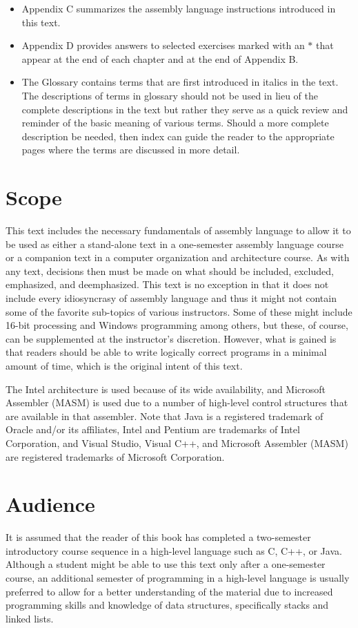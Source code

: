 \documentclass[10pt]{article}
\begin{document}
\begin{itemize}
  \item Appendix C summarizes the assembly language instructions introduced in this text.
  \item Appendix D provides answers to selected exercises marked with an $*$ that appear at the end of each chapter and at the end of Appendix B.
  \item The Glossary contains terms that are first introduced in italics in the text. The descriptions of terms in glossary should not be used in lieu of the complete descriptions in the text but rather they serve as a quick review and reminder of the basic meaning of various terms. Should a more complete description be needed, then index can guide the reader to the appropriate pages where the terms are discussed in more detail.
\end{itemize}

\section*{Scope}
This text includes the necessary fundamentals of assembly language to allow it to be used as either a stand-alone text in a one-semester assembly language course or a companion text in a computer organization and architecture course. As with any text, decisions then must be made on what should be included, excluded, emphasized, and deemphasized. This text is no exception in that it does not include every idiosyncrasy of assembly language and thus it might not contain some of the favorite sub-topics of various instructors. Some of these might include 16-bit processing and Windows programming among others, but these, of course, can be supplemented at the instructor's discretion. However, what is gained is that readers should be able to write logically correct programs in a minimal amount of time, which is the original intent of this text.

The Intel architecture is used because of its wide availability, and Microsoft Assembler (MASM) is used due to a number of high-level control structures that are available in that assembler. Note that Java is a registered trademark of Oracle and/or its affiliates, Intel and Pentium are trademarks of Intel Corporation, and Visual Studio, Visual C++, and Microsoft Assembler (MASM) are registered trademarks of Microsoft Corporation.

\section*{Audience}
It is assumed that the reader of this book has completed a two-semester introductory course sequence in a high-level language such as C, C++, or Java. Although a student might be able to use this text only after a one-semester course, an additional semester of programming in a high-level language is usually preferred to allow for a better understanding of the material due to increased programming skills and knowledge of data structures, specifically stacks and linked lists.
\end{document}
